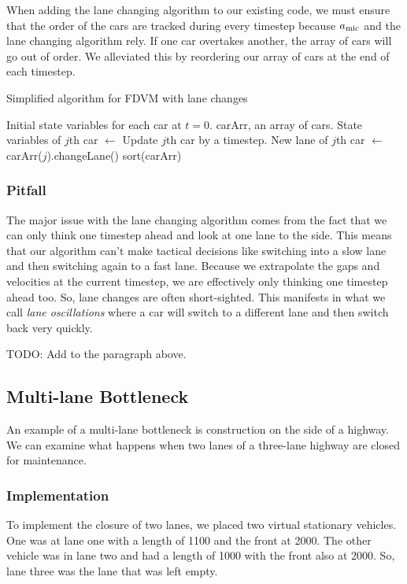 \documentclass[12pt]{article}
\begin{document}
      When adding the lane changing algorithm to our existing code, we must ensure that the order of the cars are tracked during every timestep because $a_{\rm mic}$ and the lane changing algorithm rely. If one car overtakes another, the array of cars will go out of order. We alleviated this by reordering our array of cars at the end of each timestep.  
      \begin{algorithm}
        \caption{Simplified algorithm for FDVM with lane changes}\label{alg:car-following-lane}
        \begin{algorithmic}
        \Require Initial state variables for each car at $t=0$. 
        \Require carArr, an array of cars.
          \State State variables of $j$th car $\gets$ Update $j$th car by a timestep.
          \State New lane of $j$th car $\gets$ carArr($j$).changeLane()
          \EndFor
          \State sort(carArr)
        \EndFor
        \end{algorithmic}
        \end{algorithm}
    \subsubsection{Pitfall} \label{lane change pitfalls}

    The major issue with the lane changing algorithm comes from the fact that we can only think one timestep ahead and look at one lane to the side. This means that our algorithm can't make tactical decisions like switching into a slow lane and then switching again to a fast lane. Because we extrapolate the gaps and velocities at the current timestep, we are effectively only thinking one timestep ahead too. So, lane changes are often short-sighted. This manifests in what we call \textit{lane oscillations} where a car will switch to a different lane and then switch back very quickly. 
    
    TODO: Add to the paragraph above.

    \subsection{Multi-lane Bottleneck}
    An example of a multi-lane bottleneck is construction on the side of a highway. We can examine what happens when two lanes of a three-lane highway are closed for maintenance. 
    \subsubsection{Implementation}
    To implement the closure of two lanes, we placed two virtual stationary vehicles. One was at lane one with a length of 1100 and the front at 2000. The other vehicle was in lane two and had a length of 1000 with the front also at 2000. So, lane three was the lane that was left empty.
\end{document}
